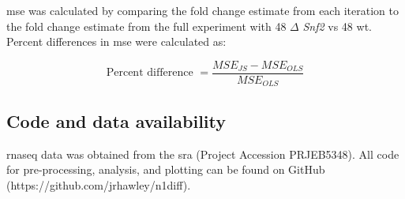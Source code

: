 \Gls{mse} was calculated by comparing the fold change estimate from each iteration to the fold change estimate from the full experiment with 48 $\Delta$ \emph{Snf2} vs 48 \gls{wt}.
Percent differences in \gls{mse} were calculated as:

\begin{equation*}
  \text{Percent difference } = \frac{MSE_{JS} - MSE_{OLS}}{MSE_{OLS}}
\end{equation*}

\subsection{Code and data availability}

\Gls{rnaseq} data was obtained from the \gls{sra} (Project Accession PRJEB5348).
All code for pre-processing, analysis, and plotting can be found on GitHub (https://github.com/jrhawley/n1diff).
